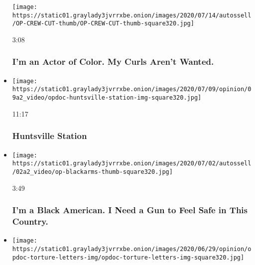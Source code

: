 \begin{itemize}
  \texttt{[image: https://static01.graylady3jvrrxbe.onion/images/2020/07/14/autossell/OP-CREW-CUT-thumb/OP-CREW-CUT-thumb-square320.jpg]}

  3:08

  \hypertarget{im-an-actor-of-color-my-curls-arent-wanted}{%
  \subsubsection{I'm an Actor of Color. My Curls Aren't
  Wanted.}\label{im-an-actor-of-color-my-curls-arent-wanted}}
\item
  \href{https://www.nytimes3xbfgragh.onion/video/opinion/100000007080462/huntsville-station.html?action=click\&module=video-series-bar\&region=header\&pgtype=Article\&playlistId=video/opinion}{}

  \texttt{[image: https://static01.graylady3jvrrxbe.onion/images/2020/07/09/opinion/09a2\_video/opdoc-huntsville-station-img-square320.jpg]}

  11:17

  \hypertarget{huntsville-station}{%
  \subsubsection{Huntsville Station}\label{huntsville-station}}
\item
  \href{https://www.nytimes3xbfgragh.onion/video/embedded/opinion/100000007209565/black-gun-ownership.html?action=click\&module=video-series-bar\&region=header\&pgtype=Article\&playlistId=video/opinion}{}

  \texttt{[image: https://static01.graylady3jvrrxbe.onion/images/2020/07/02/autossell/02a2\_video/op-blackarms-thumb-square320.jpg]}

  3:49

  \hypertarget{im-a-black-american-i-need-a-gun-to-feel-safe-in-this-country}{%
  \subsubsection{I'm a Black American. I Need a Gun to Feel Safe in This
  Country.}\label{im-a-black-american-i-need-a-gun-to-feel-safe-in-this-country}}
\item
  \href{https://www.nytimes3xbfgragh.onion/video/opinion/100000007205588/the-torture-letters.html?action=click\&module=video-series-bar\&region=header\&pgtype=Article\&playlistId=video/opinion}{}

  \texttt{[image: https://static01.graylady3jvrrxbe.onion/images/2020/06/29/opinion/opdoc-torture-letters-img/opdoc-torture-letters-img-square320.jpg]}


\end{itemize}
